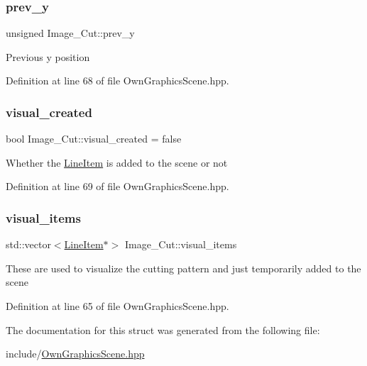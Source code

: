 \subsubsection{\texorpdfstring{prev\+\_\+y}{prev\_y}}
{\footnotesize\ttfamily unsigned Image\+\_\+\+Cut\+::prev\+\_\+y}

Previous y position 

Definition at line 68 of file Own\+Graphics\+Scene.\+hpp.

\mbox{\label{structImage__Cut_acbae7507f135d85e9f2f9724fbc2a643}} 
\subsubsection{\texorpdfstring{visual\+\_\+created}{visual\_created}}
{\footnotesize\ttfamily bool Image\+\_\+\+Cut\+::visual\+\_\+created = false}

Whether the \mbox{\hyperlink{classLineItem}{Line\+Item}} is added to the scene or not 

Definition at line 69 of file Own\+Graphics\+Scene.\+hpp.

\mbox{\label{structImage__Cut_ad56f1d72a3d7c5488fec27eaf5c6fbd9}} 
\subsubsection{\texorpdfstring{visual\+\_\+items}{visual\_items}}
{\footnotesize\ttfamily std\+::vector$<$\mbox{\hyperlink{classLineItem}{Line\+Item}}$\ast$$>$ Image\+\_\+\+Cut\+::visual\+\_\+items}

These are used to visualize the cutting pattern and just temporarily added to the scene 

Definition at line 65 of file Own\+Graphics\+Scene.\+hpp.



The documentation for this struct was generated from the following file\+:\begin{DoxyCompactItemize}
\item 
include/\mbox{\hyperlink{OwnGraphicsScene_8hpp}{Own\+Graphics\+Scene.\+hpp}}\end{DoxyCompactItemize}
